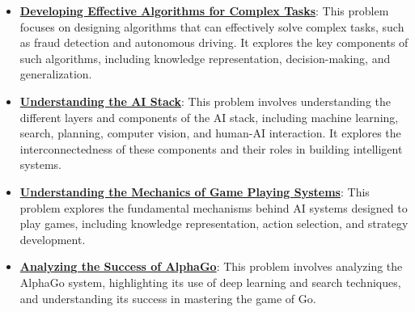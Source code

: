 \documentclass{article}%
\begin{document}
\begin{itemize}[leftmargin=*]
\item \href{https://purdue.brightspace.com/d2l/common/assets/pdfjs-d2l-dist/1.0.14-legacy/web/viewer.html?file=\%2Fcontent\%2Fenforced\%2F1095467-wl.202510.CS.24300.001\%2F02L2-Intro.pdf\%3Fou\%3D1095467\&lang=en-us\&container=d2l-fileviewer-rendered-pdf\&fullscreen=d2l-fileviewer-rendered-pdf-dialog\&height=667#page=36}{\textbf{Developing Effective Algorithms for Complex Tasks}}: This problem focuses on designing algorithms that can effectively solve complex tasks, such as fraud detection and autonomous driving. It explores the key components of such algorithms, including knowledge representation, decision{-}making, and generalization.%
\item \href{https://purdue.brightspace.com/d2l/common/assets/pdfjs-d2l-dist/1.0.14-legacy/web/viewer.html?file=\%2Fcontent\%2Fenforced\%2F1095467-wl.202510.CS.24300.001\%2F02L2-Intro.pdf\%3Fou\%3D1095467\&lang=en-us\&container=d2l-fileviewer-rendered-pdf\&fullscreen=d2l-fileviewer-rendered-pdf-dialog\&height=667#page=44}{\textbf{Understanding the AI Stack}}: This problem involves understanding the different layers and components of the AI stack, including machine learning, search, planning, computer vision, and human{-}AI interaction. It explores the interconnectedness of these components and their roles in building intelligent systems.%
\item \href{https://purdue.brightspace.com/d2l/common/assets/pdfjs-d2l-dist/1.0.14-legacy/web/viewer.html?file=\%2Fcontent\%2Fenforced\%2F1095467-wl.202510.CS.24300.001\%2F02L2-Intro.pdf\%3Fou\%3D1095467\&lang=en-us\&container=d2l-fileviewer-rendered-pdf\&fullscreen=d2l-fileviewer-rendered-pdf-dialog\&height=667#page=47}{\textbf{Understanding the Mechanics of Game Playing Systems}}: This problem explores the fundamental mechanisms behind AI systems designed to play games, including knowledge representation, action selection, and strategy development.%
\item \href{https://purdue.brightspace.com/d2l/common/assets/pdfjs-d2l-dist/1.0.14-legacy/web/viewer.html?file=\%2Fcontent\%2Fenforced\%2F1095467-wl.202510.CS.24300.001\%2F02L2-Intro.pdf\%3Fou\%3D1095467\&lang=en-us\&container=d2l-fileviewer-rendered-pdf\&fullscreen=d2l-fileviewer-rendered-pdf-dialog\&height=667#page=50}{\textbf{Analyzing the Success of AlphaGo}}: This problem involves analyzing the AlphaGo system, highlighting its use of deep learning and search techniques, and understanding its success in mastering the game of Go.%
\end{itemize}%
\end{document}
